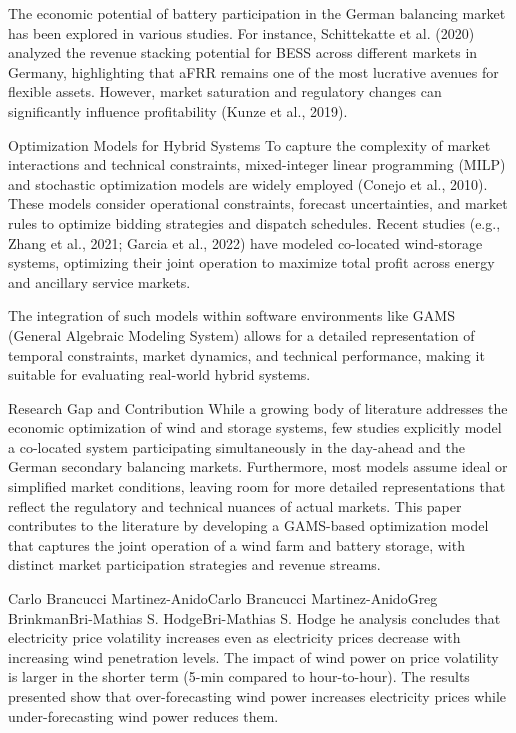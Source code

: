 The economic potential of battery participation in the German balancing market has been explored in
various studies. For instance, Schittekatte et al. (2020) analyzed the revenue stacking potential for
BESS across different markets in Germany, highlighting that aFRR remains one of the most lucrative avenues
for flexible assets. However, market saturation and regulatory changes can significantly influence profitability
(Kunze et al., 2019).

Optimization Models for Hybrid Systems
To capture the complexity of market interactions and technical constraints, mixed-integer linear programming
(MILP) and stochastic optimization models are widely employed (Conejo et al., 2010). These models consider
operational constraints, forecast uncertainties, and market rules to optimize bidding strategies and dispatch
schedules. Recent studies (e.g., Zhang et al., 2021; Garcia et al., 2022) have modeled co-located wind-storage
systems, optimizing their joint operation to maximize total profit across energy and ancillary service markets.

The integration of such models within software environments like GAMS (General Algebraic Modeling System) allows
for a detailed representation of temporal constraints, market dynamics, and technical performance, making it
suitable for evaluating real-world hybrid systems.

Research Gap and Contribution
While a growing body of literature addresses the economic optimization of wind and storage systems, few
studies explicitly model a co-located system participating simultaneously in the day-ahead and the German
secondary balancing markets. Furthermore, most models assume ideal or simplified market conditions, leaving
room for more detailed representations that reflect the regulatory and technical nuances of actual markets.
This paper contributes to the literature by developing a GAMS-based optimization model that captures the joint
operation of a wind farm and battery storage, with distinct market participation strategies and revenue streams.




Carlo Brancucci Martinez-AnidoCarlo Brancucci Martinez-AnidoGreg BrinkmanBri-Mathias S. HodgeBri-Mathias S. Hodge
he analysis concludes that electricity price volatility increases even as electricity prices decrease with increasing wind penetration levels. The impact of wind power on price volatility is larger in the shorter term (5-min compared to hour-to-hour). The results presented show that over-forecasting wind power increases electricity prices while under-forecasting wind power reduces them.